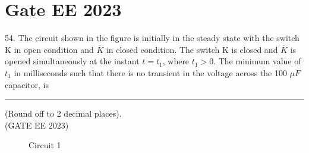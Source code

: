\documentclass[journal,12pt,twocolumn]{IEEEtran}
\begin{document}


\vspace{3cm}

\title{}
\author{EE23BTECH11054 -  Sai Krishna Shanigarapu$^{*}$
}
\maketitle
\newpage
\bigskip


\section*{Gate EE 2023}
54. \hspace{2pt}The circuit shown in the figure is initially in the steady state with the switch K in open condition and $\overline{K}$ in closed condition. The switch K is closed and $\overline{K}$ is opened simultaneously at the instant $t = t_1$, where $t_1 > 0$. The minimum value of $t_1$ in milliseconds such that there is no transient in the voltage across the 100 $\mu F$ capacitor, is \rule{1cm}{0.15mm} (Round off to 2 decimal places).\\ \hfill(GATE EE 2023)

\begin{figure}[ht]
  \centering
  \resizebox{0.8\columnwidth}{!}{}
  \caption{Circuit 1}
\end{figure}
\end{document}
